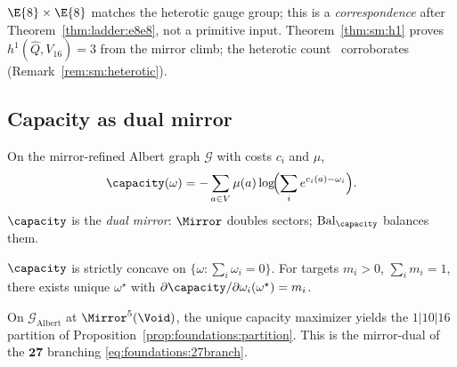 \begin{remark}\label{rem:ladder:heterotic}
$\E{8}\times\E{8}$ matches the heterotic gauge group; this is a
\emph{correspondence} after Theorem~\ref{thm:ladder:e8e8}, not a primitive
input. Theorem~\ref{thm:sm:h1} proves $h^1(\hat Q,V_{16})=3$ from the mirror climb;
the heterotic count~\cite{Witten1985} corroborates (Remark~\ref{rem:sm:heterotic}).
\end{remark}

\subsection{Capacity as dual mirror}
\label{sec:ladder:capacity}

\begin{definition}\label{def:ladder:capacity}
On the mirror-refined Albert graph $\mathcal{G}$ with costs $c_i$ and $\mu$,
\begin{equation}\label{eq:ladder:capacity}
  \capacity(\omega)=-\sum_{a\in V}\mu(a)\log\!\Bigl(\sum_{i}
  e^{c_i(a)-\omega_i}\Bigr).
\end{equation}
$\capacity$ is the \emph{dual mirror}: $\Mirror$ doubles sectors;
$\mathrm{Bal}_\capacity$ balances them.
\end{definition}

\begin{theorem}\label{thm:ladder:concave}
$\capacity$ is strictly concave on $\{\omega:\sum_i\omega_i=0\}$. For targets
$m_i>0$, $\sum_i m_i=1$, there exists unique $\omega^\star$ with
$\partial\capacity/\partial\omega_i(\omega^\star)=m_i$.
\end{theorem}

\begin{theorem}\label{thm:ladder:capacity-jordan}
On $\mathcal{G}_{\mathrm{Albert}}$ at $\Mirror^5(\Void)$, the unique capacity
maximizer yields the $1|10|16$ partition of
Proposition~\ref{prop:foundations:partition}. This is the mirror-dual of the
$\mathbf{27}$ branching \eqref{eq:foundations:27branch}.
\end{theorem}